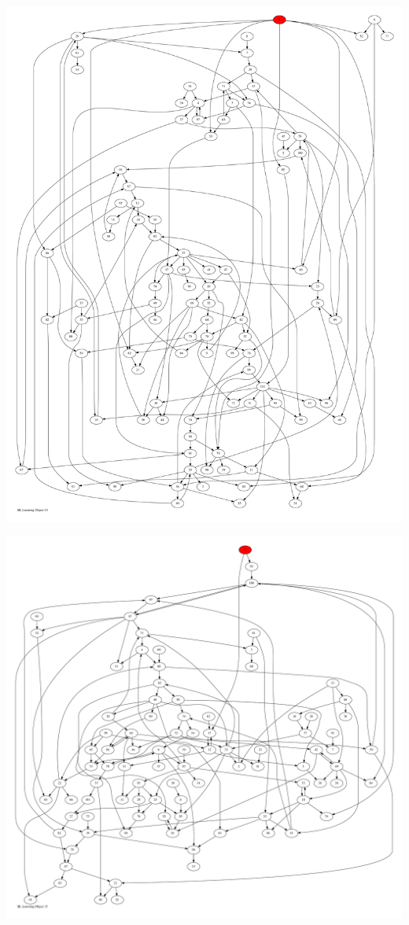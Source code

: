 \documentclass{article}
\begin{document}
\newpage
\includegraphics[max height=\textheight,max width=\textwidth]{bl_looming_objs/bl_loom_obj14_pp.pdf}

\newpage
\includegraphics[max height=\textheight,max width=\textwidth]{bl_looming_objs/bl_loom_obj15_pp.pdf}
\end{document}
